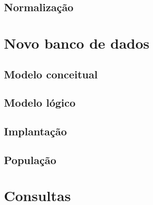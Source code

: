 \documentclass[12pt,a4paper]{article}
\begin{document}
\subsection{Normalização}\label{sec:normalizacao}

\section{Novo banco de dados}\label{sec:novobd}

\subsection{Modelo conceitual}

\subsection{Modelo lógico}

\subsection{Implantação}

\subsection{População}

\section{Consultas}\label{sec:consultas}
\end{document}
